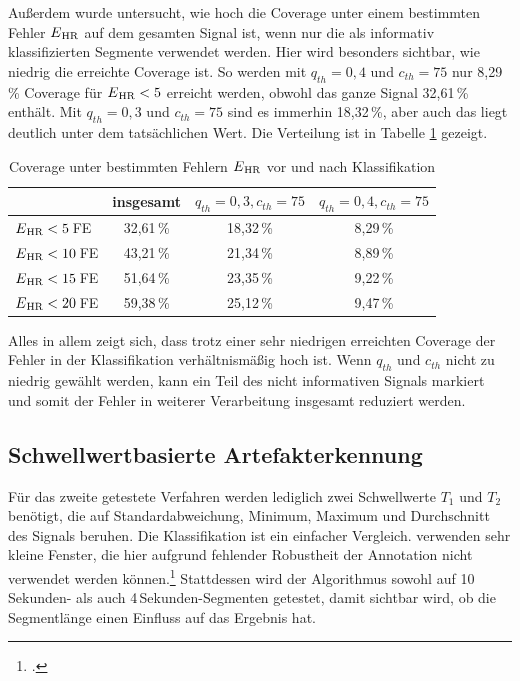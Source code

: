  Außerdem wurde untersucht, wie hoch die Coverage unter einem bestimmten Fehler $E\textsubscript{HR}$ auf dem gesamten Signal ist, wenn nur die als informativ klassifizierten Segmente verwendet werden. Hier wird besonders sichtbar, wie niedrig die erreichte Coverage ist. So werden mit $q_{th}=0{,}4$ und $c_{th}=75$ nur 8{,}29\,\% Coverage für $E\textsubscript{HR} < 5$ erreicht werden, obwohl das ganze Signal 32{,}61\,\% enthält. Mit $q_{th}=0{,}3$ und $c_{th}=75$ sind es immerhin 18{,}32\,\%, aber auch das liegt deutlich unter dem tatsächlichen Wert. Die Verteilung ist in Tabelle \ref{fig:brueser-coverage} gezeigt.
 
 \begin{table}[h]
 	\centering
  	\begin{tabular}{l || c | c | c}
 											& insgesamt 		& $q_{th}=0{,}3, c_{th}=75$ & $q_{th}=0{,}4, c_{th}=75$\\\hline
 		$E\textsubscript{HR} < 5$\,\si{FE} 	&  32{,}61\,\% 	& 18,32\,\% 					& 8,29\,\%	\\
 		$E\textsubscript{HR} < 10$\,\si{FE} 	&  43{,}21\,\% 	& 21,34\,\% 					& 8,89\,\%	\\
 		$E\textsubscript{HR} < 15$\,\si{FE} 	&  51{,}64\,\% 	& 23,35\,\% 					& 9,22\,\%	\\
 		$E\textsubscript{HR} < 20$\,\si{FE} 	&  59{,}38\,\% 	& 25,12\,\% 					& 9,47\,\%\\
 	\end{tabular}
 	\caption[Coverage unter bestimmten Fehlern $E\textsubscript{HR}$ vor und nach Klassifikation durch Betrachtung der Ähnlichkeit der \ac{CLIE}-Intervallschätzer]{Coverage unter bestimmten Fehlern $E\textsubscript{HR}$ vor und nach Klassifikation}
 	\label{fig:brueser-coverage}
 \end{table}
 
 Alles in allem zeigt sich, dass trotz einer sehr niedrigen erreichten Coverage der Fehler in der Klassifikation verhältnismäßig hoch ist. Wenn $q_{th}$ und $c_{th}$ nicht zu niedrig gewählt werden, kann ein Teil des nicht informativen Signals markiert und somit der Fehler in weiterer Verarbeitung insgesamt reduziert werden. 
 

\subsection{Schwellwertbasierte Artefakterkennung}

Für das zweite getestete Verfahren werden lediglich zwei Schwellwerte $T_1$ und $T_2$ benötigt, die auf Standardabweichung, Minimum, Maximum und Durchschnitt des Signals beruhen. Die Klassifikation ist ein einfacher Vergleich. \citeauthor{Pino2015} verwenden sehr kleine Fenster, die hier aufgrund fehlender Robustheit der Annotation nicht verwendet werden können.\footcite[]{Pino2015} Stattdessen wird der Algorithmus sowohl auf 10\,Sekunden- als auch 4\,Sekunden-Segmenten getestet, damit sichtbar wird, ob die Segmentlänge einen Einfluss auf das Ergebnis hat.

